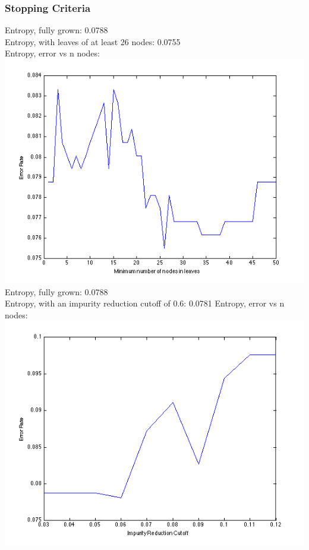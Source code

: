 \documentclass[11pt,a4paper]{article}
\begin{document}
\subsubsection{Stopping Criteria}
Entropy, fully grown: 0.0788\\
Entropy, with leaves of at least 26 nodes: 0.0755\\
Entropy, error vs n nodes:\\
\includegraphics[width=\textwidth]{decision_tree_entropy_error_vs_n_nodes.png}
Entropy, fully grown: 0.0788\\
Entropy, with an impurity reduction cutoff of 0.6: 0.0781
Entropy, error vs n nodes:\\
\includegraphics[width=\textwidth]{decision_tree_entropy_error_vs_imp_red.png}
\end{document}
